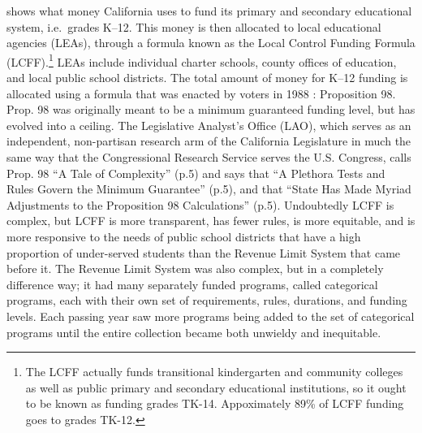  shows what money California uses to fund its primary and secondary educational system, i.e.~grades K–12. This money is then allocated to local educational agencies (LEAs), through a formula known as the Local Control Funding Formula (LCFF).\footnote{The LCFF actually funds transitional kindergarten and community colleges as well as public primary and secondary educational institutions, so it ought to be known as funding grades TK-14. Appoximately 89\% of LCFF funding goes to grades TK-12.} LEAs include individual charter schools, county offices of education, and local public school districts. The total amount of money for K–12 funding is allocated using a formula that was enacted by voters in 1988 \parencite{LAO2017}: Proposition 98. Prop. 98 was originally meant to be a minimum guaranteed funding level, but has evolved into a ceiling. The Legislative Analyst's Office (LAO), which serves as an independent, non-partisan research arm of the California Legislature in much the same way that the Congressional Research Service serves the U.S. Congress, calls Prop. 98 ``A Tale of Complexity''  (p.5) and says that ``A Plethora Tests and Rules Govern the Minimum Guarantee'' (p.5), and that ``State Has Made Myriad Adjustments to the Proposition 98 Calculations'' (p.5). Undoubtedly LCFF is complex, but LCFF is more transparent, has fewer rules, is more equitable, and is more responsive to the needs of public school districts that have a high proportion of under-served students than the Revenue Limit System that came before it. The Revenue Limit System was also complex, but in a completely difference way; it had many separately funded programs, called categorical programs, each with their own set of requirements, rules, durations, and funding levels. Each passing year saw more programs being added to the set of categorical programs until the entire collection became both unwieldy and inequitable.

